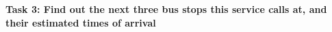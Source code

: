 \documentclass[10pt,twocolumn]{article}
\begin{document}
\textbf{Task 3: Find out the next three bus stops this service calls at, and their estimated times of arrival}
\begin{figure}[htbp]
    \begin{minipage}[b]{0.5\linewidth}
        \centering
    \end{minipage}
    \hfill
    \begin{minipage}[b]{0.5\linewidth}
        \centering
    \end{minipage}
\end{figure}
\end{document}
